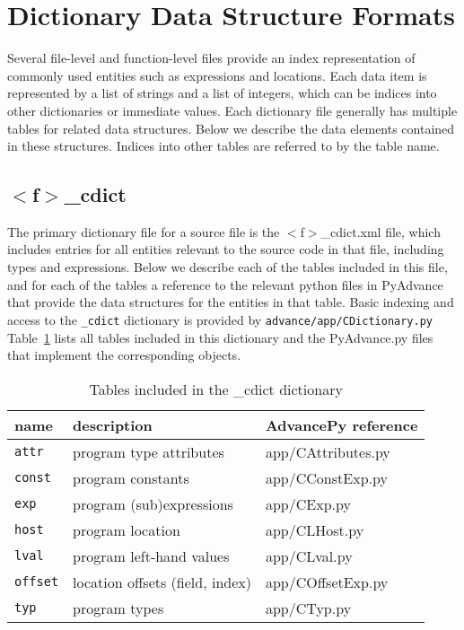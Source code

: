 \documentclass[11pt]{article}
\newcommand\fname{$<$f$>$}
\begin{document}
\section{Dictionary Data Structure Formats}

Several file-level and function-level files provide an index representation
of commonly used entities such as expressions and locations. Each data item is
represented by a list of strings and a list of integers, which can be indices
into other dictionaries or immediate values. Each dictionary file generally
has multiple tables for related data structures. Below we describe the
data elements contained in these structures. Indices into other tables are
referred to by the table name.

\subsection{\fname\_cdict}

The primary dictionary file for a source file is the \fname\_cdict.xml file,
which includes entries for all entities relevant to the source code in that
file, including types and expressions. Below we describe each of the tables
included in this file, and for each of the tables a reference to the relevant
python files in PyAdvance that provide the data structures for the entities
in that table. Basic indexing and access to the {\tt \_cdict} dictionary is 
provided by {\tt advance/app/CDictionary.py} Table~\ref{tab:cdict} lists all
tables included in this dictionary and the PyAdvance.py files that implement
the corresponding objects.

\begin{table}
\centering
\begin{tabular}{l|l|l}
name & description & AdvancePy reference\\  \hline
{\tt attr} & program type attributes & app/CAttributes.py \\
{\tt const} & program constants & app/CConstExp.py\\
{\tt exp} & program (sub)expressions & app/CExp.py \\
{\tt host} & program location & app/CLHost.py \\
{\tt lval} & program left-hand values & app/CLval.py\\
{\tt offset} & location offsets (field, index) & app/COffsetExp.py \\
{\tt typ} & program types & app/CTyp.py \\
\end{tabular}
\caption{\label{tab:cdict}Tables included in the \_cdict dictionary}
\end{table}
\end{document}
